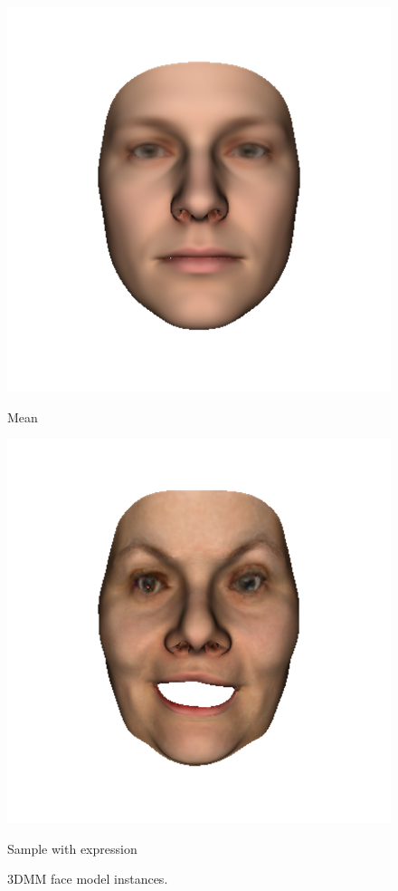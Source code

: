 \begin{figure}
\begin{minipage}{.32\textwidth}
      \includegraphics[width=\textwidth]{Figures/Pictures/mean_t.png}
      \caption*{Mean}
    \end{minipage}
    \begin{minipage}{.32\textwidth}
        \centering
        \includegraphics[width=\textwidth]{Figures/Pictures/rs2_expr_t.png}
        \caption*{Sample with expression}
    \end{minipage} 
      \captionsetup{labelformat=default}   
      \caption{3DMM face model instances.}
      \label{f2.1}
\end{figure}

